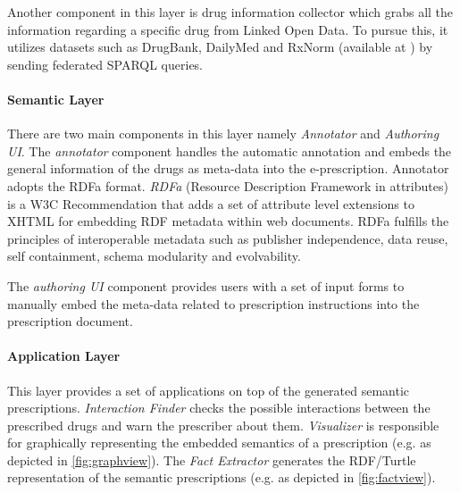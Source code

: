 \documentclass[conference]{IEEEtran}
\begin{document}
Another component in this layer is drug information collector which grabs all the information regarding a specific drug from Linked Open Data.
To pursue this, it utilizes datasets such as DrugBank, DailyMed and RxNorm (available at \cite{lodd}) by sending federated SPARQL queries.

\paragraph{Semantic Layer}
There are two main components in this layer namely \emph{Annotator} and \emph{Authoring UI}.
The \emph{annotator} component handles the automatic annotation and embeds the general information of the drugs as meta-data into the e-prescription.
Annotator adopts the RDFa format. \emph{RDFa} (Resource Description Framework in attributes) is a W3C Recommendation that adds a set of attribute level extensions to XHTML for embedding RDF metadata within web documents.
RDFa fulfills the principles of interoperable metadata such as publisher independence, data reuse, self containment, schema modularity and evolvability.

The \emph{authoring UI} component provides users with a set of input forms to manually embed the meta-data related to prescription instructions into the prescription document.

\paragraph{Application Layer}
This layer provides a set of applications on top of the generated semantic prescriptions.
\emph{Interaction Finder} checks the possible interactions between the prescribed drugs and warn the prescriber about them.
\emph{Visualizer} is responsible for graphically representing the embedded semantics of a prescription (e.g. as depicted in \autoref{fig:graphview}).
The \emph{Fact Extractor} generates the RDF/Turtle representation of the semantic prescriptions (e.g. as depicted in \autoref{fig:factview}).
\end{document}
